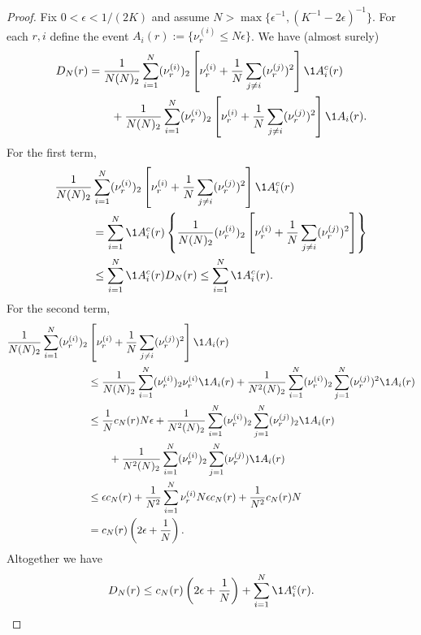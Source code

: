 \begin{proof}
Fix $0 < \epsilon < 1/(2K)$ and assume $N > \max\{ \epsilon^{-1}, (K^{-1} - 2\epsilon)^{-1} \}$. For each $r,i$ define the event $A_i(r) := \{ \nu_r^{(i)} \leq N\epsilon \}$.
We have (almost surely)
\begin{align*}
D_N(r)
&= \frac{1}{N(N)_2} \sum_{i=1}^N (\nu_r^{(i)})_2 \left[ \nu_r^{(i)} 
        + \frac{1}{N} \sum_{j\neq i} (\nu_r^{(j)})^2 \right] \1{A_i^c(r)} \\
    &\qquad+ \frac{1}{N(N)_2} \sum_{i=1}^N (\nu_r^{(i)})_2 \left[ \nu_r^{(i)} 
        + \frac{1}{N} \sum_{j\neq i} (\nu_r^{(j)})^2 \right] \1{A_i(r)} .
\end{align*}
For the first term, 
\begin{align*}
\frac{1}{N(N)_2} &\sum_{i=1}^N (\nu_r^{(i)})_2 \left[ \nu_r^{(i)} 
        + \frac{1}{N} \sum_{j\neq i} (\nu_r^{(j)})^2 \right] \1{A_i^c(r)} \\
&= \sum_{i=1}^N \1{A_i^c(r)} \left\{ \frac{1}{N(N)_2} (\nu_r^{(i)})_2 \left[ \nu_r^{(i)} 
        + \frac{1}{N} \sum_{j\neq i} (\nu_r^{(j)})^2 \right] \right\} \\
&\leq \sum_{i=1}^N \1{A_i^c(r)} D_N(r)
\leq \sum_{i=1}^N \1{A_i^c(r)} .
\end{align*}
For the second term,
\begin{align*}
\frac{1}{N(N)_2} \sum_{i=1}^N (\nu_r^{(i)})_2 &\left[ \nu_r^{(i)} 
        + \frac{1}{N} \sum_{j\neq i} (\nu_r^{(j)})^2 \right] \1{A_i(r)} \\
&\leq \frac{1}{N(N)_2} \sum_{i=1}^N (\nu_r^{(i)})_2 \nu_r^{(i)} \1{A_i(r)} 
        + \frac{1}{N^2(N)_2} \sum_{i=1}^N (\nu_r^{(i)})_2 \sum_{j=1}^N 
        (\nu_r^{(j)})^2 \1{A_i(r)} \\
&\leq \frac{1}{N} c_N(r) N\epsilon
        + \frac{1}{N^2(N)_2} \sum_{i=1}^N (\nu_r^{(i)})_2 \sum_{j=1}^N 
        (\nu_r^{(j)})_2 \1{A_i(r)} \\
    &\qquad+ \frac{1}{N^2(N)_2} \sum_{i=1}^N (\nu_r^{(i)})_2 \sum_{j=1}^N 
        (\nu_r^{(j)}) \1{A_i(r)} \\
&\leq \epsilon c_N(r) 
        + \frac{1}{N^2} \sum_{i=1}^N \nu_r^{(i)} N\epsilon c_N(r) 
        + \frac{1}{N^2} c_N(r) N \\
&= c_N(r) \left( 2\epsilon + \frac{1}{N} \right).
\end{align*}
Altogether we have
\begin{equation*}
D_N(r) 
\leq c_N(r) \left( 2\epsilon + \frac{1}{N} \right)
        + \sum_{i=1}^N \1{A_i^c(r)} .
\end{equation*}

\end{proof}
